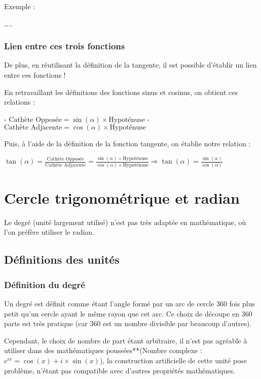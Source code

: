 \documentclass[a4paper]{article}
\begin{document}
			Exemple :

			…..

		\subsubsection{Lien entre ces trois fonctions}

			De plus, en réutilisant la définition de la tangente, il est possible d'établir un lien entre ces fonctions !

			En retravaillant les définitions des fonctions sinus et cosinus, on obtient ces relations :

			- $\text{Cathète Opposée} = \sin(\alpha) \times \text{Hypoténuse}$
			- $\text{Cathète Adjacente} = \cos(\alpha) \times \text{Hypoténuse}$

			Puis, à l'aide de la définition de la fonction tangente, on établie notre relation :

			$\tan(\alpha) = \frac{\text{Cathète Opposée}}{\text{Cathète Adjacente}} = \frac{\sin(\alpha) \times \text{Hypoténuse}}{\cos(\alpha) \times \text{Hypoténuse}} \Longrightarrow \tan(\alpha) = \frac{\sin(\alpha)}{\cos(\alpha)}$

	\section{Cercle trigonométrique et radian}

		Le degré (unité largement utilisé) n'est pas très adaptée en mathématique, où l'on préfère utiliser le radian.

		\subsection{Définitions des unités}

			\subsubsection{Définition du degré}

				Un degré est définit comme étant l'angle formé par un arc de cercle 360 fois plus petit qu'un cercle ayant le même rayon que cet arc. Ce choix de découpe en 360 parts est très pratique (car 360 est un nombre divisible par beaucoup d'autres). 

				Cependant, le choix de nombre de part étant arbitraire, il n'est pas agréable à utiliser dans des mathématiques poussées**(Nombre complexe : $e^{ix}=\cos(x)+i \times \sin(x)$), la construction artificielle de cette unité pose problème, n'étant pas compatible avec d'autres propriétés mathématiques. 
\end{document}

